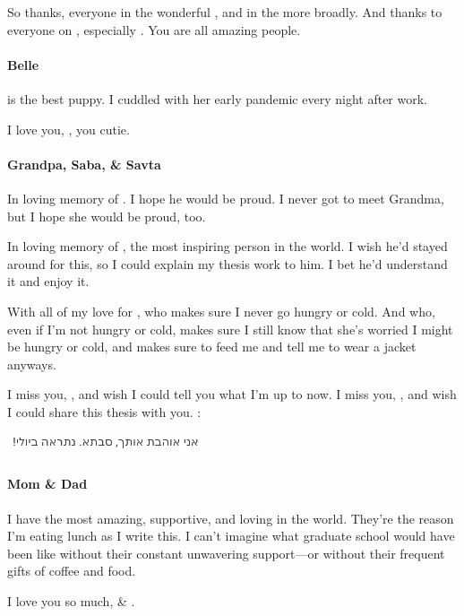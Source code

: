 So thanks, everyone in the wonderful , and in the  more broadly.
And thanks to everyone on , especially .
You are all amazing people.

\paragraph{Belle}

 is the best puppy. I cuddled with her early pandemic every night after work.

I love you, , you cutie.

\paragraph{Grandpa, Saba, \& Savta}

In loving memory of . I hope he would be proud.
I never got to meet Grandma, but I hope she would be proud, too.

In loving memory of , the most inspiring person in the world.
I wish he'd stayed around for this, so I could explain my thesis work to him.
I bet he'd understand it and enjoy it.

With all of my love for , who makes sure I never go hungry or cold.
And who, even if I'm not hungry or cold, makes sure I still know that she's worried I might be hungry or cold,
and makes sure to feed me and tell me to wear a jacket anyways.

I miss you, , and wish I could tell you what I'm up to now.
I miss you, , and wish I could share this thesis with you.
:

\begin{flushright}
\includegraphics[height=6mm]{savta.png}
\end{flushright}

\paragraph{Mom \& Dad}

I have the most amazing, supportive, and loving  in the world.
They're the reason I'm eating lunch as I write this.
I can't imagine what graduate school would have been like without their constant
unwavering support---or without their frequent gifts of coffee and food.

I love you so much,  \& .

